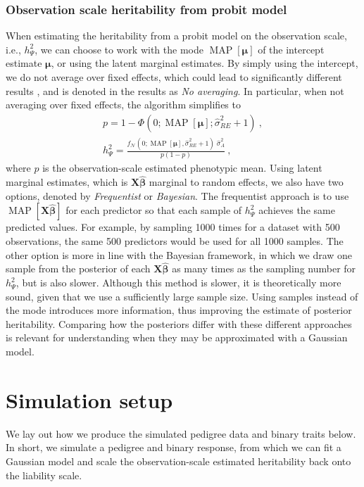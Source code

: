 \subsubsection{Observation scale heritability from probit model} \label{sec:method:qgglmm settings}
When estimating the heritability from a probit model on the observation scale, i.e., $h^2_{\Psi}$, we can choose to work with the mode $\operatorname{MAP}[\bm\mu]$ of the intercept estimate $\bm\mu$, or using the latent marginal estimates. By simply using the intercept, we do not average over fixed effects, which could lead to significantly different results \autocite{de2016general}, and is denoted in the results as \textit{No averaging}. In particular, when not averaging over fixed effects, the algorithm simplifies to
\begin{align}
    p = 1 - \Phi(0; \operatorname{MAP}[\bm\mu]; \hat\sigma^2_{RE}+1) \ , \\
    h^2_\Psi = \frac{f_\mathcal{N}(0; \operatorname{MAP}[\bm\mu], \hat\sigma^2_{RE}+1)\; \hat\sigma^2_A}{p(1-p)} \ ,
\end{align}
where $p$ is the observation-scale estimated phenotypic mean. Using latent marginal estimates, which is $\bm X\bm\hat{\bm\beta}$ marginal to random effects, we also have two options, denoted by \textit{Frequentist} or \textit{Bayesian}. The frequentist approach is to use $\operatorname{MAP}[\bm X\bm\hat{\bm\beta}]$ for each predictor so that each sample of $h^2_{\Psi}$ achieves the same predicted values. For example, by sampling 1000 times for a dataset with 500 observations, the same 500 predictors would be used for all 1000 samples. The other option is more in line with the Bayesian framework, in which we draw one sample from the posterior of each $\bm X \bm{\hat\beta}$ as many times as the sampling number for $h^2_{\Psi}$, but is also slower. Although this method is slower, it is theoretically more sound, given that we use a sufficiently large sample size. Using samples instead of the mode introduces more information, thus improving the estimate of posterior heritability. Comparing how the posteriors differ with these different approaches is relevant for understanding when they may be approximated with a Gaussian model.


\section{Simulation setup}
We lay out how we produce the simulated pedigree data and binary traits below. In short, we simulate a pedigree and binary response, from which we can fit a Gaussian model and scale the observation-scale estimated heritability back onto the liability scale.

